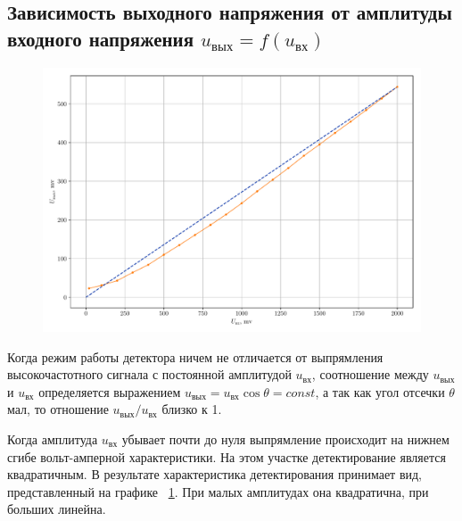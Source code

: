\subsection{Зависимость выходного напряжения от амплитуды входного напряжения $u_\text{вых}=f(u_\text{вх})$}
\begin{figure}[h!]
	\centering
	\includegraphics[width=0.8\linewidth]{plots/exp3a.pdf}
	\caption{}
	\label{exp:3.2}
\end{figure}

Когда режим работы детектора ничем не отличается от выпрямления высокочастотного сигнала с постоянной амплитудой $u_\text{вх}$, соотношение между $u_\text{вых}$ и $u_\text{вх}$ определяется выражением $u_\text{вых}=u_\text{вх}\cos\theta=const$, а так как угол отсечки $\theta$ мал, то отношение $u_\text{вых}/u_\text{вх}$ близко к 1.

Когда амплитуда $u_\text{вх}$ убывает почти до нуля выпрямление происходит на нижнем сгибе вольт-амперной характеристики. На этом участке детектирование является квадратичным. В результате характеристика детектирования принимает вид, представленный на графике ~\ref{exp:3.2}. При малых амплитудах она квадратична, при больших линейна.  
